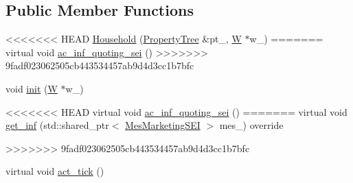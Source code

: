 \subsection*{Public Member Functions}
{\bf }\par
\begin{DoxyCompactItemize}
\item 
<<<<<<< HEAD
\hyperlink{classsolar__core_1_1_household_a5f84bf614d0ec70abf9597ec97e07b1a}{Household} (\hyperlink{namespacesolar__core_adeda2737d6938c190eb774a5b2495045}{Property\+Tree} \&pt\+\_\+, \hyperlink{classsolar__core_1_1_w}{W} $\ast$w\+\_\+)
=======
virtual void \hyperlink{classsolar__core_1_1_household_a165b7c64c72e5ed4ea08307e32082517}{ac\+\_\+inf\+\_\+quoting\+\_\+sei} ()
>>>>>>> 9fadf023062505cb443534457ab9d4d3cc1b7bfc
\item 
void \hyperlink{classsolar__core_1_1_household_ab8c15758602643f2290ef1b9ddf2a2ca}{init} (\hyperlink{classsolar__core_1_1_w}{W} $\ast$w\+\_\+)
\end{DoxyCompactItemize}

{\bf }\par
\begin{DoxyCompactItemize}
\item 
<<<<<<< HEAD
virtual void \hyperlink{classsolar__core_1_1_household_a165b7c64c72e5ed4ea08307e32082517}{ac\+\_\+inf\+\_\+quoting\+\_\+sei} ()
=======
virtual void \hyperlink{classsolar__core_1_1_household_ac9d26af7b52f0cdc357fc5dca4b86ad9}{get\+\_\+inf} (std\+::shared\+\_\+ptr$<$ \hyperlink{classsolar__core_1_1_mes_marketing_s_e_i}{Mes\+Marketing\+S\+E\+I} $>$ mes\+\_\+) override
\end{DoxyCompactItemize}

{\bf }\par
\begin{DoxyCompactItemize}
>>>>>>> 9fadf023062505cb443534457ab9d4d3cc1b7bfc
\item 
virtual void \hyperlink{classsolar__core_1_1_household_a1e7d20a60dc42b8d09a8d23a4cdb26a6}{act\+\_\+tick} ()
\end{DoxyCompactItemize}

